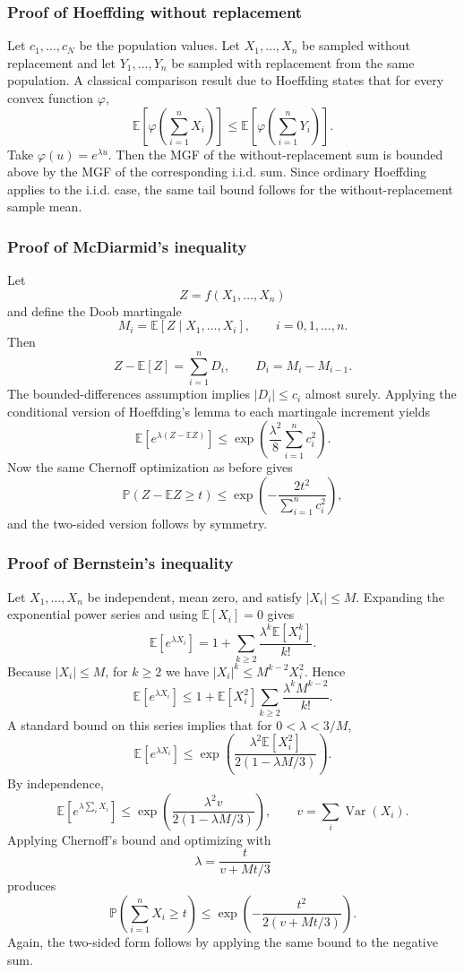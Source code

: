 \documentclass[11pt]{article}
\newcommand{\E}{\mathbb{E}}
\newcommand{\Pbb}{\mathbb{P}}
\begin{document}
\begin{solutionbox}
\subsubsection*{Proof of Hoeffding without replacement}
Let $c_1,\dots,c_N$ be the population values. Let $X_1,\dots,X_n$ be sampled without replacement and let $Y_1,\dots,Y_n$ be sampled with replacement from the same population. A classical comparison result due to Hoeffding states that for every convex function $\varphi$,
\[
\E\left[\varphi\!\left(\sum_{i=1}^n X_i\right)\right]
\le
\E\left[\varphi\!\left(\sum_{i=1}^n Y_i\right)\right].
\]
Take $\varphi(u)=e^{\lambda u}$. Then the MGF of the without-replacement sum is bounded above by the MGF of the corresponding i.i.d. sum. Since ordinary Hoeffding applies to the i.i.d. case, the same tail bound follows for the without-replacement sample mean.

\subsubsection*{Proof of McDiarmid's inequality}
Let
\[
Z=f(X_1,\dots,X_n)
\]
and define the Doob martingale
\[
M_i = \E[Z\mid X_1,\dots,X_i], \qquad i=0,1,\dots,n.
\]
Then
\[
Z-\E[Z] = \sum_{i=1}^n D_i,
\qquad
D_i=M_i-M_{i-1}.
\]
The bounded-differences assumption implies $|D_i|\le c_i$ almost surely. Applying the conditional version of Hoeffding's lemma to each martingale increment yields
\[
\E[e^{\lambda(Z-\E Z)}]
\le
\exp\!\left(\frac{\lambda^2}{8}\sum_{i=1}^n c_i^2\right).
\]
Now the same Chernoff optimization as before gives
\[
\Pbb(Z-\E Z\ge t)
\le
\exp\!\left(-\frac{2t^2}{\sum_{i=1}^n c_i^2}\right),
\]
and the two-sided version follows by symmetry.

\subsubsection*{Proof of Bernstein's inequality}
Let $X_1,\dots,X_n$ be independent, mean zero, and satisfy $|X_i|\le M$. Expanding the exponential power series and using $\E[X_i]=0$ gives
\[
\E[e^{\lambda X_i}] = 1+\sum_{k\ge 2}\frac{\lambda^k\E[X_i^k]}{k!}.
\]
Because $|X_i|\le M$, for $k\ge 2$ we have $|X_i|^k\le M^{k-2}X_i^2$. Hence
\[
\E[e^{\lambda X_i}]
\le
1+\E[X_i^2]\sum_{k\ge2}\frac{\lambda^kM^{k-2}}{k!}.
\]
A standard bound on this series implies that for $0<\lambda<3/M$,
\[
\E[e^{\lambda X_i}]
\le
\exp\!\left(\frac{\lambda^2\E[X_i^2]}{2(1-\lambda M/3)}\right).
\]
By independence,
\[
\E\left[e^{\lambda\sum_i X_i}\right]
\le
\exp\!\left(\frac{\lambda^2 v}{2(1-\lambda M/3)}\right),
\qquad
v=\sum_i \operatorname{Var}(X_i).
\]
Applying Chernoff's bound and optimizing with
\[
\lambda = \frac{t}{v+Mt/3}
\]
produces
\[
\Pbb\left(\sum_{i=1}^n X_i\ge t\right)
\le
\exp\!\left(-\frac{t^2}{2(v+Mt/3)}\right).
\]
Again, the two-sided form follows by applying the same bound to the negative sum.


\end{solutionbox}
\end{document}
